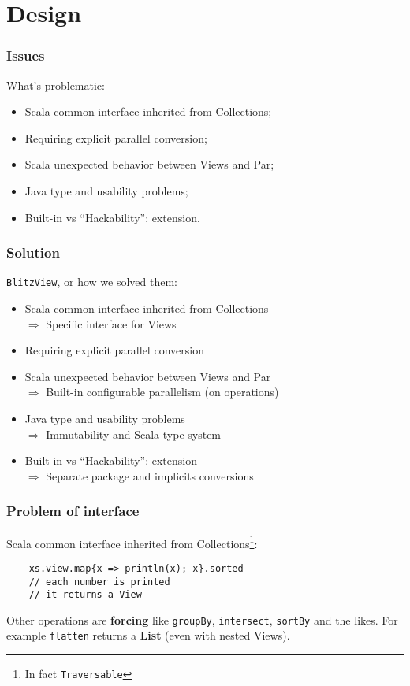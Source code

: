 \documentclass[12pt]{beamer}
\begin{document}
\section{Design}
\begin{frame}
    \frametitle{Issues}
    What's problematic:
    \begin{itemize}
        \item Scala common interface inherited from Collections;
        \item Requiring explicit parallel conversion;
        \item Scala unexpected behavior between Views and Par;
        \item Java type and usability problems;
        \item Built-in vs ``Hackability'': extension.
    \end{itemize}
\end{frame}

\begin{frame}
    \frametitle{Solution}
    {\tt BlitzView}, or how we solved them:
    \begin{itemize}
        \item Scala common interface inherited from Collections \\
            $\Rightarrow$ Specific interface for Views
        \item Requiring explicit parallel conversion \\
        \item Scala unexpected behavior between Views and Par \\
            $\Rightarrow$ Built-in configurable parallelism (on operations)
        \item Java type and usability problems \\
            $\Rightarrow$ Immutability and Scala type system
        \item Built-in vs ``Hackability'': extension \\
            $\Rightarrow$ Separate package and implicits conversions
    \end{itemize}
\end{frame}

\begin{frame}[fragile]
    \frametitle{Problem of interface}
    Scala common interface inherited from Collections\footnote{In fact {\tt Traversable}}:
    \begin{lstlisting}
    xs.view.map{x => println(x); x}.sorted
    // each number is printed
    // it returns a View
    \end{lstlisting}
    Other operations are {\bf forcing} like \verb|groupBy|, \verb|intersect|, \verb|sortBy| and the likes.
    For example \verb|flatten| returns a {\bf List} (even with nested Views).
\end{frame}
\end{document}
